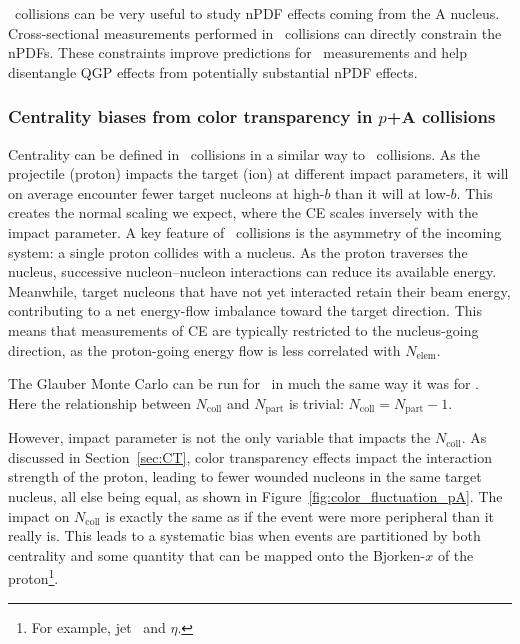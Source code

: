 \pxA\ collisions can be very useful to study nPDF effects coming from the A nucleus.
Cross-sectional measurements performed in \pxA\ collisions can directly constrain the nPDFs.
These constraints improve predictions for \AxA\ measurements and help disentangle QGP effects from potentially substantial nPDF effects.

\subsubsection{\texorpdfstring{Centrality biases from color transparency in $p$+A collisions}{Centrality biases from color transparency in p+A collisions}}
\label{sec:pAcentBias}
Centrality can be defined in \pxA\ collisions in a similar way to \AxA\ collisions.
As the projectile (proton) impacts the target (ion) at different impact parameters, it will on average encounter fewer target nucleons at high-$b$ than it will at low-$b$.
This creates the normal scaling we expect, where the CE scales inversely with the impact parameter.
A key feature of \pxA\ collisions is the asymmetry of the incoming system: a single proton collides with a nucleus.
As the proton traverses the nucleus, successive nucleon--nucleon interactions can reduce its available energy.
Meanwhile, target nucleons that have not yet interacted retain their beam energy, contributing to a net energy-flow imbalance toward the target direction.
This means that measurements of CE are typically restricted to the nucleus-going direction, as the proton-going energy flow is less correlated with $N_{\mathrm{elem}}$.

The Glauber Monte Carlo can be run for \pxA\ in much the same way it was for \AxA.
Here the relationship between $N_{\mathrm{coll}}$ and $N_{\mathrm{part}}$ is trivial: $N_{\mathrm{coll}} = N_{\mathrm{part}} -1$.

However, impact parameter is not the only variable that impacts the $N_{\mathrm{coll}}$.
As discussed in Section~\ref{sec:CT}, color transparency effects impact the interaction strength of the proton, leading to fewer wounded nucleons in the same target nucleus, all else being equal, as shown in Figure~\ref{fig:color_fluctuation_pA}.  The impact on $N_{\mathrm{coll}}$ is exactly the same as if the event were more peripheral than it really is.
This leads to a systematic bias when events are partitioned by both centrality and some quantity that can be mapped onto the Bjorken-$x$ of the proton\footnote{For example, jet \PT\ and $\eta$.}.


